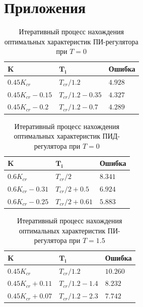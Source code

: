 \newpage

\section{Приложения}
\begin{table}[h!]
	\centering
	\begin{tabularx}{\textwidth}{
			| >{\arraybackslash}X
			| >{\arraybackslash}X
			| >{\arraybackslash}X
			|}
		\hline
		$\mathbf{K}$ & $\mathbf{T_i}$ & \textbf{Ошибка}\\\hline
		$0.45 K_{cr}$ & $T_{cr} / 1.2$ & $4.928$\\\hline
		$0.45 K_{cr} - 0.15$ & $T_{cr} / 1.2 - 0.35$ & $4.327$\\\hline
		$0.45 K_{cr} - 0.2$ & $T_{cr} / 1.2 - 0.7$ & $4.289$\\\hline
	\end{tabularx}
	\caption{Итеративный процесс нахождения оптимальных характеристик ПИ-регулятора при $T = 0$}
\end{table}

\bigskip

\begin{table}[h!]
	\centering
	\begin{tabularx}{\textwidth}{
			| >{\arraybackslash}X
			| >{\arraybackslash}X
			| >{\arraybackslash}X
			|}
		\hline
		$\mathbf{K}$ & $\mathbf{T_i}$ & \textbf{Ошибка}\\\hline
		$0.6 K_{cr}$ & $T_{cr} / 2$ & $8.341$\\\hline
		$0.6 K_{cr} - 0.31$ & $T_{cr} / 2 + 0.5$ & $6.924$\\\hline
		$0.6 K_{cr} - 0.25$ & $T_{cr} / 2 + 0.61$ & $5.883$\\\hline
	\end{tabularx}
	\caption{Итеративный процесс нахождения оптимальных характеристик ПИД-регулятора при $T = 0$}
\end{table}

\bigskip

\begin{table}[h!]
	\centering
	\begin{tabularx}{\textwidth}{
			| >{\arraybackslash}X
			| >{\arraybackslash}X
			| >{\arraybackslash}X
			|}
		\hline
		$\mathbf{K}$ & $\mathbf{T_i}$ & \textbf{Ошибка}\\\hline
		$0.45 K_{cr}$ & $T_{cr} / 1.2$ & $10.260$\\\hline
		$0.45 K_{cr} + 0.11$ & $T_{cr} / 1.2 - 1.4$ & $8.232$\\\hline
		$0.45 K_{cr} + 0.07$ & $T_{cr} / 1.2 - 2.3$ & $7.742$\\\hline
	\end{tabularx}
	\caption{Итеративный процесс нахождения оптимальных характеристик ПИ-регулятора при $T = 1.5$}
\end{table}

